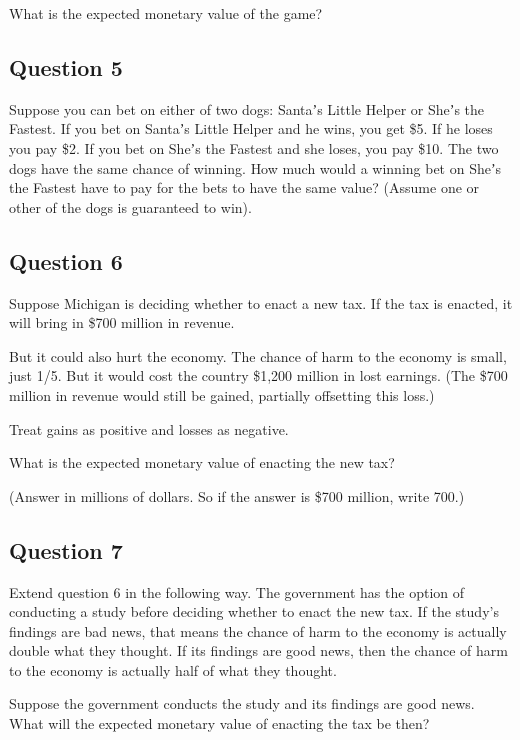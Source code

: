 \documentclass[
  11pt,
]{article}
\begin{document}
What is the expected monetary value of the game?

\hypertarget{question-5}{%
\subsection{Question 5}\label{question-5}}

Suppose you can bet on either of two dogs: Santaʼs Little Helper or
Sheʼs the Fastest. If you bet on Santaʼs Little Helper and he wins, you
get \$5. If he loses you pay \$2. If you bet on Sheʼs the Fastest and
she loses, you pay \$10. The two dogs have the same chance of winning.
How much would a winning bet on Sheʼs the Fastest have to pay for the
bets to have the same value? (Assume one or other of the dogs is
guaranteed to win).

\hypertarget{question-6}{%
\subsection{Question 6}\label{question-6}}

Suppose Michigan is deciding whether to enact a new tax. If the tax is
enacted, it will bring in \$700 million in revenue.

But it could also hurt the economy. The chance of harm to the economy is
small, just 1/5. But it would cost the country \$1,200 million in lost
earnings. (The \$700 million in revenue would still be gained, partially
offsetting this loss.)

Treat gains as positive and losses as negative.

What is the expected monetary value of enacting the new tax?

(Answer in millions of dollars. So if the answer is \$700 million, write
700.)

\hypertarget{question-7}{%
\subsection{Question 7}\label{question-7}}

Extend question 6 in the following way. The government has the option of
conducting a study before deciding whether to enact the new tax. If the
study's findings are bad news, that means the chance of harm to the
economy is actually double what they thought. If its findings are good
news, then the chance of harm to the economy is actually half of what
they thought.

Suppose the government conducts the study and its findings are good
news. What will the expected monetary value of enacting the tax be then?
\end{document}
